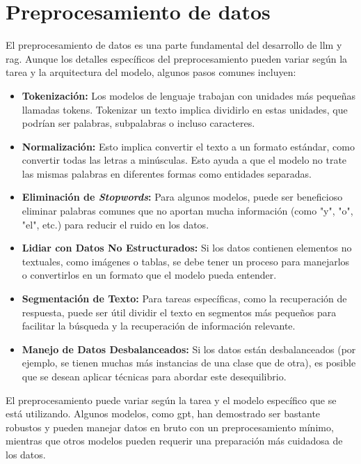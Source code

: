 \section{Preprocesamiento de datos}

El preprocesamiento de datos es una parte fundamental del desarrollo de \acrlong{llm} y \acrlong{rag}. Aunque los detalles específicos del preprocesamiento pueden variar según la tarea y la arquitectura del modelo, algunos pasos comunes incluyen:

\begin{itemize}

\item \textbf{Tokenización:} Los modelos de lenguaje trabajan con unidades más pequeñas llamadas tokens. Tokenizar un texto implica dividirlo en estas unidades, que podrían ser palabras, subpalabras o incluso caracteres.

\item \textbf{Normalización:} Esto implica convertir el texto a un formato estándar, como convertir todas las letras a minúsculas. Esto ayuda a que el modelo no trate las mismas palabras en diferentes formas como entidades separadas.
 
\item \textbf{Eliminación de \textit{Stopwords}:} Para algunos modelos, puede ser beneficioso eliminar palabras comunes que no aportan mucha información (como "y", "o", "el", etc.) para reducir el ruido en los datos.

\item \textbf{Lidiar con Datos No Estructurados:} Si los datos contienen elementos no textuales, como imágenes o tablas, se debe tener un proceso para manejarlos o convertirlos en un formato que el modelo pueda entender.

\item \textbf{Segmentación de Texto:} Para tareas específicas, como la recuperación de respuesta, puede ser útil dividir el texto en segmentos más pequeños para facilitar la búsqueda y la recuperación de información relevante.

\item \textbf{Manejo de Datos Desbalanceados:} Si los datos están desbalanceados (por ejemplo, se tienen muchas más instancias de una clase que de otra), es posible que se desean aplicar técnicas para abordar este desequilibrio.

\end{itemize}

El preprocesamiento puede variar según la tarea y el modelo específico que se está utilizando. Algunos modelos, como \acrfull{gpt}, han demostrado ser bastante robustos y pueden manejar datos en bruto con un preprocesamiento mínimo, mientras que otros modelos pueden requerir una preparación más cuidadosa de los datos. 

